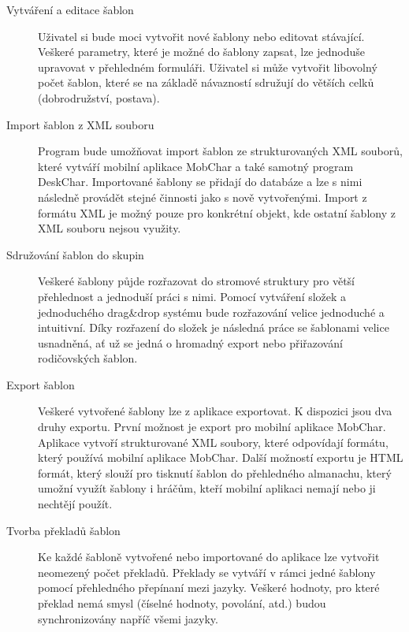 \documentclass[thesis=B,czech]{resources/FITthesis}[2012/06/26]
\begin{document}
\begin{description}
\item[Vytváření a editace šablon] Uživatel si bude moci vytvořit nové šablony nebo editovat stávající. Veškeré parametry, které je možné do šablony zapsat, lze jednoduše upravovat v přehledném formuláři. Uživatel si může vytvořit libovolný počet šablon, které se na základě návazností sdružují do větších celků (dobrodružství, postava).

\item[Import šablon z XML souboru] Program bude umožňovat import šablon ze strukturovaných XML souborů, které vytváří mobilní aplikace MobChar a také samotný program DeskChar. Importované šablony se přidají do databáze a lze s nimi následně provádět stejné činnosti jako s nově vytvořenými. Import z formátu XML je možný pouze pro konkrétní objekt, kde ostatní šablony z XML souboru nejsou využity.

\item[Sdružování šablon do skupin] Veškeré šablony půjde rozřazovat do stromové struktury pro větší přehlednost a jednoduší práci s nimi. Pomocí vytváření složek a jednoduchého drag\&drop systému bude rozřazování velice jednoduché a intuitivní. Díky rozřazení do složek je následná práce se šablonami velice usnadněná, ať už se jedná o hromadný export nebo přiřazování rodičovských šablon.

\item[Export šablon] Veškeré vytvořené šablony lze z aplikace exportovat. K dispozici jsou dva druhy exportu. První možnost je export pro mobilní aplikace MobChar. Aplikace vytvoří strukturované XML soubory, které odpovídají formátu, který používá mobilní aplikace MobChar. Další možností exportu je HTML formát, který slouží pro tisknutí šablon do přehledného almanachu, který umožní využít šablony i hráčům, kteří mobilní aplikaci nemají nebo ji nechtějí použít. 

\item[Tvorba překladů šablon] Ke každé šabloně vytvořené nebo importované do aplikace lze vytvořit neomezený počet překladů. Překlady se vytváří v rámci jedné šablony pomocí přehledného přepínaní mezi jazyky. Veškeré hodnoty, pro které překlad nemá smysl (číselné hodnoty, povolání, atd.) budou synchronizovány napříč všemi jazyky.
\end{description}
\end{document}
